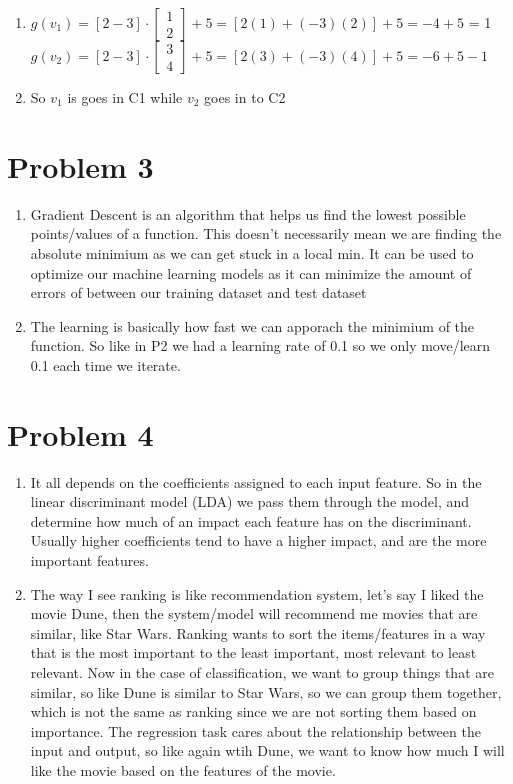 \documentclass{article}
\begin{document}
\begin{enumerate}[label=(\alph*)]
    \item $g(v_1)= [2 -3]\cdot \begin{bmatrix}
        1\\
        2
    \end{bmatrix} + 5= [2(1)+(-3)(2)] +5 = -4+5   $ = 1
    \\$g(v_2) = [2 -3] \cdot \begin{bmatrix}
        3\\
        4
    \end{bmatrix}    +5 = [2(3)+(-3)(4)] +5 = -6+5 -1 $
    \item So $v_1$ is goes in C1 while $v_2$ goes in to C2
\end{enumerate}
\section*{Problem 3}
\begin{enumerate}[label=(\alph*)]
    \item Gradient Descent is an algorithm that helps us find the lowest possible points/values of a function. 
    This doesn't necessarily mean we are finding the absolute minimium as we can get stuck in a local min. It can be 
    used to optimize our machine learning models as it can minimize the amount of errors of between our training dataset and 
    test dataset 
    \item The learning is basically how fast we can apporach the minimium of the function. So like in P2 we had a learning rate of 0.1
    so we only move/learn 0.1 each time we iterate. 
\end{enumerate}
\section*{Problem 4}
\begin{enumerate}[label=(\alph*)]
    \item It all depends on the coefficients assigned to each input feature. So in the linear discriminant model (LDA)
    we pass them through the model, and determine how much of an impact each feature has on the discriminant. Usually higher coefficients tend
    to have a higher impact, and are the more important features. 
    \item The way I see ranking is like recommendation system, let's say I liked the movie Dune, then the system/model will recommend me movies that are similar, like Star Wars. Ranking wants to sort the 
    items/features in a way that is the most important to the least important, most relevant to least relevant. Now in the case of classification, we want to group things that are similar, so like Dune is similar to Star Wars, so we can group them together, which is not the same as ranking since we are not sorting them based on importance.
    The regression task cares about the relationship between the input and output, so like again wtih Dune, we want to know how much I will like the movie based on the features of the movie.
\end{enumerate}
\end{document}
